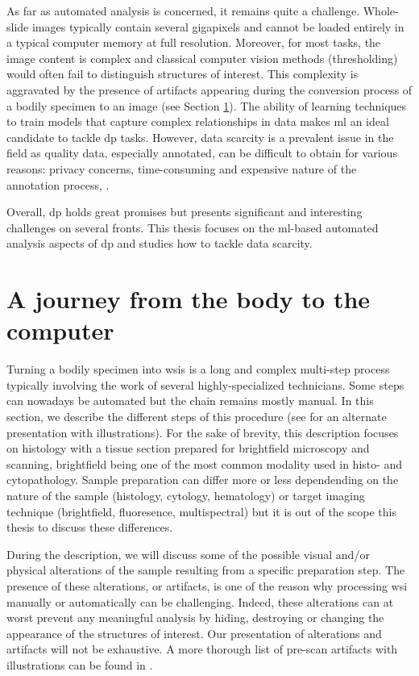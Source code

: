 As far as automated analysis is concerned, it remains quite a challenge. Whole-slide images typically contain several gigapixels and cannot be loaded entirely in a typical computer memory at full resolution. Moreover, for most tasks, the image content is complex and classical computer vision methods (\eg thresholding) would often fail to distinguish structures of interest. This complexity is aggravated by the presence of artifacts \parencite{taqi2018review} appearing during the conversion process of a bodily specimen to an image (see Section \ref{sec:backdp:wsi}). The ability of learning techniques to train models that capture complex relationships in data makes \acrlong{ml} an ideal candidate to tackle \acrlong{dp} tasks. However, data scarcity is a prevalent issue in the field as quality data, especially annotated, can be difficult to obtain for various reasons: privacy concerns, time-consuming and expensive nature of the annotation process, \etc.     

Overall, \acrlong{dp} holds great promises but presents significant and interesting challenges on several fronts. This thesis focuses on the \acrshort{ml}-based automated analysis aspects of \acrlong{dp} and studies how to tackle data scarcity.

\section{A journey from the body to the computer}
\label{sec:backdp:wsi}

Turning a bodily specimen into \acrlong{wsi}s is a long and complex multi-step process typically involving the work of several highly-specialized technicians. Some steps can nowadays be automated but the chain remains mostly manual. In this section, we describe the different steps of this procedure (see \parencite{mccann2014automated} for an alternate presentation with illustrations). For the sake of brevity, this description focuses on histology with a tissue section prepared for brightfield microscopy and scanning, brightfield being one of the most common modality used in histo- and cytopathology. Sample preparation can differ more or less dependending on the nature of the sample (\eg histology, cytology, hematology) or target imaging technique (\eg brightfield, fluoresence, multispectral) but it is out of the scope this thesis to discuss these differences. 

During the description, we will discuss some of the possible visual and/or physical alterations of the sample resulting from a specific preparation step. The presence of these alterations, or artifacts, is one of the reason why processing \acrshort{wsi} manually or automatically can be challenging. Indeed, these alterations can at worst prevent any meaningful analysis by hiding, destroying or changing the appearance of the structures of interest. Our presentation of alterations and artifacts will not be exhaustive. A more thorough list of pre-scan artifacts with illustrations can be found in \parencite{taqi2018review}. 

